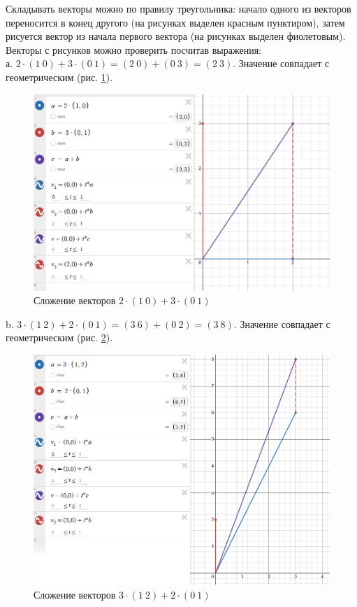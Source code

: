 \documentclass[14pt,a4paper]{extarticle}
\begin{document}
Складывать векторы можно по правилу треугольника:
начало одного из векторов переносится в конец другого (на рисунках выделен красным пунктиром),
затем рисуется вектор из начала первого вектора (на рисунках выделен фиолетовым).
Векторы с рисунков можно проверить посчитав выражения:\\
а. $2 \cdot (1 \ 0) + 3 \cdot (0 \ 1) = (2 \ 0)+(0 \ 3)=(2 \ 3)$. Значение совпадает с геометрическим (рис. \ref{pic:a}).
\begin{figure}[h!]
    \centering
    \includegraphics[scale=0.5]{pic7/5.a.png}
    \caption{Сложение векторов $2 \cdot (1 \ 0) + 3 \cdot (0 \ 1)$}
    \label{pic:a}
\end{figure}
\FloatBarrier
b. $3 \cdot (1 \ 2) + 2 \cdot (0 \ 1) = (3 \ 6)+(0 \ 2)=(3 \ 8)$. Значение совпадает с геометрическим (рис. \ref{pic:b}).
\begin{figure}[h!]
    \centering
    \includegraphics[scale=0.5]{pic7/5.b.png}
    \caption{Сложение векторов $3 \cdot (1 \ 2) + 2 \cdot (0 \ 1)$}
    \label{pic:b}
\end{figure}
\end{document}
